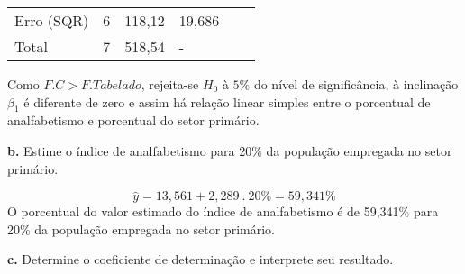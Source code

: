 \documentclass[
]{book}
\begin{document}
\begin{longtable}[]{@{}llllll@{}}
\begin{minipage}[t]{0.14\columnwidth}
Erro (SQR)\strut
\end{minipage} & \begin{minipage}[t]{0.14\columnwidth}\raggedright
6\strut
\end{minipage} & \begin{minipage}[t]{0.14\columnwidth}\raggedright
118,12\strut
\end{minipage} & \begin{minipage}[t]{0.14\columnwidth}\raggedright
19,686\strut
\end{minipage} & \begin{minipage}[t]{0.14\columnwidth}\raggedright
\strut
\end{minipage} & \begin{minipage}[t]{0.14\columnwidth}\raggedright
\strut
\end{minipage}\tabularnewline
\begin{minipage}[t]{0.14\columnwidth}\raggedright
Total\strut
\end{minipage} & \begin{minipage}[t]{0.14\columnwidth}\raggedright
7\strut
\end{minipage} & \begin{minipage}[t]{0.14\columnwidth}\raggedright
518,54\strut
\end{minipage} & \begin{minipage}[t]{0.14\columnwidth}\raggedright
-\strut
\end{minipage} & \begin{minipage}[t]{0.14\columnwidth}\raggedright
\strut
\end{minipage} & \begin{minipage}[t]{0.14\columnwidth}\raggedright
\strut
\end{minipage}\tabularnewline
\bottomrule
\end{longtable}

Como \(F.C > F. Tabelado\), rejeita-se \(H_0\) à \(5\%\) do nível de significância, à inclinação \(\beta_1\) é diferente de zero e assim há relação linear simples entre o porcentual de analfabetismo e porcentual do setor primário.

\textbf{b.} Estime o índice de analfabetismo para 20\% da população empregada no setor primário.

\[\hat{y}=13,561+2,289 \ . \ 20\%=59,341\%\]
O porcentual do valor estimado do índice de analfabetismo é de 59,341\% para 20\% da população empregada no setor primário.

\textbf{c.} Determine o coeficiente de determinação e interprete seu resultado.
\end{document}
